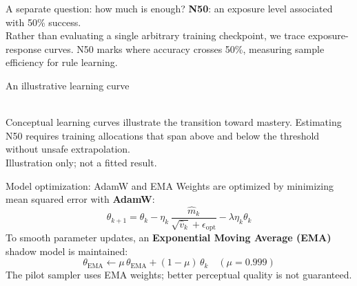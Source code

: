\documentclass[aspectratio=169,11pt]{beamer}
\newcommand{\captionnote}[1]{{\scriptsize\color{gray}#1}}
\begin{document}
\begin{frame}{A separate question: how much is enough?}
\Large \textbf{N50}: an exposure level associated with 50\% success.
\vspace{4mm}\\
\normalsize Rather than evaluating a single arbitrary training checkpoint, we trace exposure-response curves. N50 marks where accuracy crosses 50\%, measuring sample efficiency for rule learning.
\end{frame}

\begin{frame}{An illustrative learning curve}
\centering{}\\
\vspace{1mm}
\normalsize Conceptual learning curves illustrate the transition toward mastery. Estimating N50 requires training allocations that span above and below the threshold without unsafe extrapolation.
\vspace{1mm}\\\captionnote{Illustration only; not a fitted result.}
\end{frame}

\begin{frame}{Model optimization: AdamW and EMA}
\normalsize Weights are optimized by minimizing mean squared error with \textbf{AdamW}:
\[\theta_{k+1} = \theta_k - \eta_k \, \frac{\hat{m}_k}{\sqrt{\hat{v}_k} + \epsilon_{\text{opt}}} - \lambda \eta_k \theta_k\]
\vspace{-2mm}
To smooth parameter updates, an \textbf{Exponential Moving Average (EMA)} shadow model is maintained:
\[\theta_{\text{EMA}} \leftarrow \mu \, \theta_{\text{EMA}} + (1 - \mu) \, \theta_k \quad (\mu = 0.999)\]
\small The pilot sampler uses EMA weights; better perceptual quality is not guaranteed.
\end{frame}
\end{document}
